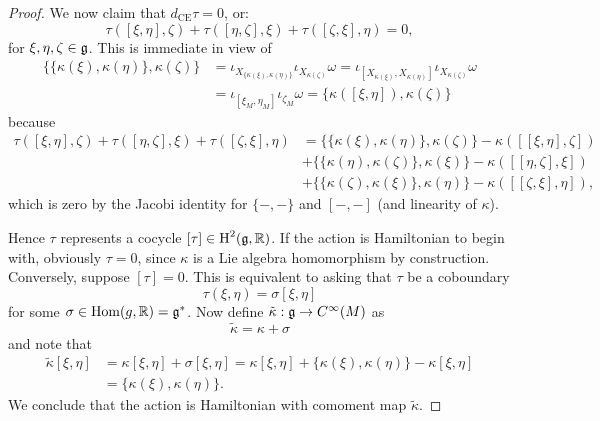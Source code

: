 \documentclass{amsart}
\begin{document}
\begin{proof}
    We now claim that $d_\textrm{CE}\tau=0$, or:
    \begin{equation*}
        \tau([\xi,\eta],\zeta) + \tau([\eta,\zeta],\xi) + \tau([\zeta,\xi],\eta) = 0,
    \end{equation*}
    for $\xi,\eta,\zeta\in\mathfrak g$. This is immediate in view of
    \begin{align*}
        \{\{\kappa(\xi),\kappa(\eta)\},\kappa(\zeta)\} &= \iota_{X_{\{\kappa(\xi),\kappa(\eta)\}}}\iota_{X_{\kappa(\zeta)}}\omega
        =\iota_{[X_{\kappa(\xi)},X_{\kappa(\eta)}]}\iota_{X_{\kappa(\zeta)}}\omega\\
        &= \iota_{[\xi_M,\eta_M]}\iota_{\zeta_M}\omega = \{\kappa([\xi,\eta]),\kappa(\zeta)\}
    \end{align*}
    because
    \begin{align*}
        \tau([\xi,\eta],\zeta) + \tau([\eta,\zeta],\xi)+\tau([\zeta,\xi],\eta) &= \{\{\kappa(\xi),\kappa(\eta)\},\kappa(\zeta)\} - \kappa([ [\xi,\eta],\zeta])\\
        &+\{\{\kappa(\eta),\kappa(\zeta)\},\kappa(\xi)\} - \kappa([[\eta,\zeta],\xi])\\
        &+\{\{\kappa(\zeta),\kappa(\xi)\},\kappa(\eta)\} - \kappa([[\zeta,\xi],\eta]),
    \end{align*}
    which is zero by the Jacobi identity for $\{-,-\}$ and $[-,-]$ (and linearity of $\kappa$).

    Hence $\tau$ represents a cocycle $[\tau]\in\operatorname{H}^2(\mathfrak g,\mathbb{R})$. If the action is Hamiltonian
    to begin with, obviously $\tau=0$, since $\kappa$ is a Lie algebra homomorphism by construction.
    Conversely, suppose $[\tau]=0$. This is equivalent to asking that $\tau$ be a coboundary
    \begin{equation*}
        \tau(\xi,\eta)=\sigma[\xi,\eta]
    \end{equation*}
    for some $\sigma\in\operatorname{Hom}(g,\mathbb{R})=\mathfrak g^*$. Now define $\tilde\kappa:\mathfrak g\to C^\infty(M)$ as
    \begin{equation*}
        \tilde\kappa = \kappa + \sigma
    \end{equation*}
    and note that 
    \begin{align*}
        \tilde\kappa[\xi,\eta] &= \kappa[\xi,\eta] + \sigma[\xi,\eta]=\kappa[\xi,\eta] + \{\kappa(\xi),\kappa(\eta)\} - \kappa[\xi,\eta]\\
        &= \{\kappa(\xi),\kappa(\eta)\}.
    \end{align*}
    We conclude that the action is Hamiltonian with comoment map $\tilde\kappa$.
\end{proof}
\end{document}
